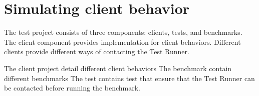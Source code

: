 
\section{Simulating client behavior}


The test project consists of three components: clients, tests, and benchmarks.
The client component provides implementation for client behaviors. Different clients provide different ways of contacting the Test Runner.

The client project detail different client behaviors
The benchmark contain different benchmarks
The test contains test that ensure that the Test Runner can be contacted before running the benchmark.
